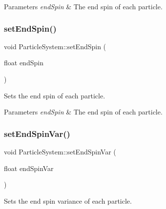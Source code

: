 \begin{DoxyParams}{Parameters}
{\em end\+Spin} & The end spin of each particle. \\
\hline
\end{DoxyParams}
\mbox{\label{classParticleSystem_ad79df08329c6f08e0223111eae6b65e0}} 
\subsubsection{\texorpdfstring{set\+End\+Spin()}{setEndSpin()}\hspace{0.1cm}{\footnotesize\ttfamily [2/2]}}
{\footnotesize\ttfamily void Particle\+System\+::set\+End\+Spin (\begin{DoxyParamCaption}\item[{float}]{end\+Spin }\end{DoxyParamCaption})\hspace{0.3cm}{\ttfamily [inline]}}

Sets the end spin of each particle.


\begin{DoxyParams}{Parameters}
{\em end\+Spin} & The end spin of each particle. \\
\hline
\end{DoxyParams}
\mbox{\label{classParticleSystem_a27c18cce7626182bc71b523f607587d5}} 
\subsubsection{\texorpdfstring{set\+End\+Spin\+Var()}{setEndSpinVar()}\hspace{0.1cm}{\footnotesize\ttfamily [1/2]}}
{\footnotesize\ttfamily void Particle\+System\+::set\+End\+Spin\+Var (\begin{DoxyParamCaption}\item[{float}]{end\+Spin\+Var }\end{DoxyParamCaption})\hspace{0.3cm}{\ttfamily [inline]}}

Sets the end spin variance of each particle.


